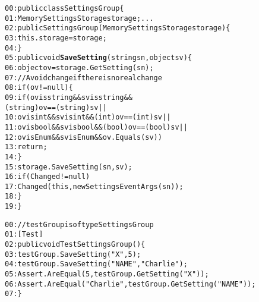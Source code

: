 \begin{figure}[t]
\begin{CodeOut}
\begin{alltt}
00:public class SettingsGroup \{
01:\hspace*{0.1in}MemorySettingsStorage storage; ...
02:\hspace*{0.1in}public SettingsGroup(MemorySettingsStorage storage) \{
03:\hspace*{0.2in}this.storage = storage;
04:\hspace*{0.1in}\}
05:\hspace*{0.1in}public void \textbf{SaveSetting}(string sn, object sv) \{
06:\hspace*{0.2in}object ov = storage.GetSetting( sn );
07:\hspace*{0.2in}//Avoid change if there is no real change
08:\hspace*{0.2in}if (ov != null ) \{
09:\hspace*{0.3in}if (ov is string && sv is string && 
\hspace*{1.0in}(string)ov == (string)sv ||
10:\hspace*{0.4in}ov is int && sv is int && (int)ov == (int)sv ||
11:\hspace*{0.4in}ov is bool && sv is bool && (bool)ov == (bool)sv ||
12:\hspace*{0.4in}ov is Enum && sv is Enum && ov.Equals(sv))
13:\hspace*{0.5in}return;
14:\hspace*{0.2in}\}
15:\hspace*{0.2in}storage.SaveSetting(sn, sv);
16:\hspace*{0.2in}if (Changed != null)
17:\hspace*{0.3in}Changed(this, new SettingsEventArgs(sn));
18:\hspace*{0.1in}\}
19:\}
\end{alltt}
\end{CodeOut}\vspace*{-4ex}
\vspace*{-1ex}
\begin{CodeOut}
\begin{alltt}
00://testGroup is of type SettingsGroup
01:[Test]
02:public void TestSettingsGroup() \{
03:\hspace*{0.1in}testGroup.SaveSetting("X", 5);
04:\hspace*{0.1in}testGroup.SaveSetting("NAME", "Charlie");
05:\hspace*{0.1in}Assert.AreEqual(5, testGroup.GetSetting("X"));
06:\hspace*{0.1in}Assert.AreEqual("Charlie", testGroup.GetSetting("NAME"));
07:\}
\end{alltt}
\end{CodeOut}\vspace*{-4ex}
\vspace*{-1ex}
\end{figure}

